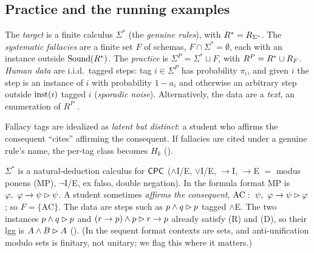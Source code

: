 \subsection{Practice and the running examples}\label{sec:setting:practice}

\begin{definition}[Practice]\label{def:setting:practice}
The \emph{target} is a finite calculus $\Sigma^*$ (the \emph{genuine rules}), with
$R^{*}=R_{\Sigma^*}$. The \emph{systematic fallacies} are a finite set $F$ of
schemas, $F\cap\Sigma^*=\emptyset$, each with an instance outside
$\mathrm{Sound}(R^{*})$. The \emph{practice} is $\Sigma^P=\Sigma^*\sqcup F$, with
$R^P=R^{*}\cup R_F$. \emph{Human data} are i.i.d.\ tagged steps: tag
$i\in\Sigma^P$ has probability $\pi_i$, and given $i$ the step is an instance of
$i$ with probability $1-a_i$ and otherwise an arbitrary step outside $\mathrm{inst}(i)$
tagged $i$ (\emph{sporadic noise}). Alternatively, the data are a \emph{text}, an
enumeration of $R^P$ \citep{gold1967language}.
\end{definition}

Fallacy tags are idealized as \emph{latent but distinct}: a student who affirms
the consequent ``cites'' affirming the consequent. If
fallacies are cited under a genuine rule's name, the per-tag class becomes $H_k$
().

\begin{example}\label{ex:setting:nd}
$\Sigma^*$ is a natural-deduction calculus for $\mathsf{CPC}$ ($\wedge$I/E, $\vee$I/E,
$\to$I, $\to$E $=$ modus ponens (MP), $\neg$I/E, ex falso, double negation). In
the formula format MP is $\varphi,\ \varphi\to\psi\rhd\psi$. A student sometimes
\emph{affirms the consequent}, $\mathrm{AC}:\ \psi,\ \varphi\to\psi\step\varphi$;
so $F=\{\mathrm{AC}\}$. The data are steps such as $p\wedge q\rhd p$ tagged
$\wedge$E. The two instances $p\wedge q\rhd p$ and $(r\to p)\wedge p\rhd r\to p$
already satisfy (R) and (D), so their lgg is $A\wedge B\rhd A$
(). (In the sequent format contexts are sets, and
anti-unification modulo sets is finitary, not unitary; we flag this where it
matters.)
\end{example}

